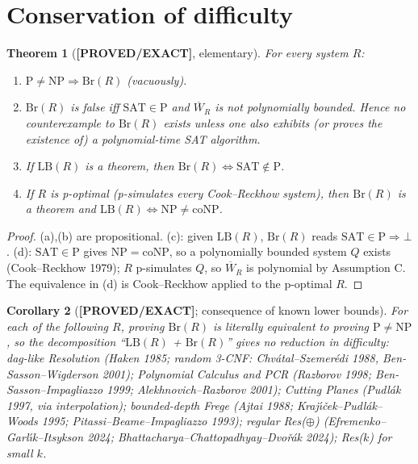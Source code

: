\documentclass[11pt]{article}
\newtheorem{theorem}{Theorem}
\newtheorem{corollary}[theorem]{Corollary}
\theoremstyle{definition}
\theoremstyle{remark}
\newcommand{\SAT}{\mathrm{SAT}}
\newcommand{\Br}{\mathrm{Br}}
\newcommand{\LB}{\mathrm{LB}}
\newcommand{\status}[1]{\textbf{[#1]}}
\begin{document}
\section{Conservation of difficulty}
\begin{theorem}[\status{PROVED/EXACT}, elementary]\label{thm:cons}
For every system $R$:
\begin{enumerate}
\item[(a)] $\mathrm P\ne\mathrm{NP}\Rightarrow\Br(R)$ (vacuously).
\item[(b)] $\Br(R)$ is false iff $\SAT\in\mathrm P$ and $\overline W_R$ is not polynomially bounded.
Hence no counterexample to $\Br(R)$ exists unless one also exhibits (or proves the existence of) a
polynomial-time SAT algorithm.
\item[(c)] If $\LB(R)$ is a theorem, then $\Br(R)\iff\SAT\notin\mathrm P$.
\item[(d)] If $R$ is p-optimal (p-simulates every Cook--Reckhow system), then $\Br(R)$ is a theorem
and $\LB(R)\iff\mathrm{NP}\ne\mathrm{coNP}$.
\end{enumerate}
\end{theorem}
\begin{proof}(a),(b) are propositional. (c): given $\LB(R)$, $\Br(R)$ reads $\SAT\in\mathrm P\Rightarrow\bot$.
(d): $\SAT\in\mathrm P$ gives $\mathrm{NP}=\mathrm{coNP}$, so a polynomially bounded system $Q$ exists
(Cook--Reckhow 1979); $R$ p-simulates $Q$, so $\overline W_R$ is polynomial by Assumption C. The
equivalence in (d) is Cook--Reckhow applied to the p-optimal $R$.\end{proof}

\begin{corollary}[\status{PROVED/EXACT}; consequence of known lower bounds]
For each of the following $R$, proving $\Br(R)$ is \emph{literally equivalent} to proving
$\mathrm P\ne\mathrm{NP}$, so the decomposition ``$\LB(R)$ + $\Br(R)$'' gives no reduction in
difficulty: dag-like Resolution (Haken 1985; random 3-CNF: Chv\'atal--Szemer\'edi 1988,
Ben-Sasson--Wigderson 2001); Polynomial Calculus and PCR (Razborov 1998; Ben-Sasson--Impagliazzo 1999;
Alekhnovich--Razborov 2001); Cutting Planes (Pudlák 1997, via interpolation); bounded-depth Frege
(Ajtai 1988; Kraj\'\i\v{c}ek--Pudl\'ak--Woods 1995; Pitassi--Beame--Impagliazzo 1993);
regular Res($\oplus$) (Efremenko--Garl\'\i k--Itsykson 2024; Bhattacharya--Chattopadhyay--Dvo\v{r}\'ak 2024);
Res($k$) for small $k$.
\end{corollary}
\end{document}
